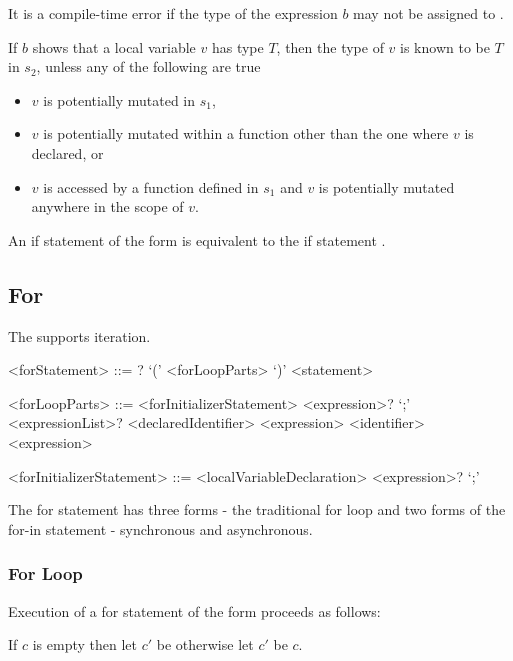 \documentclass[makeidx]{article}
\begin{document}
{\LMHash{}%
It is a compile-time error if the type of the expression $b$ may not be assigned to .

\LMHash{}%
If $b$ shows that a local variable $v$ has type $T$,
then the type of $v$ is known to be $T$ in $s_2$,
unless any of the following are true
\begin{itemize}
\item $v$ is potentially mutated in $s_1$,
\item $v$ is potentially mutated within a function other
than the one where $v$ is declared, or
\item $v$ is accessed by a function defined in $s_1$ and
$v$ is potentially mutated anywhere in the scope of $v$.
\end{itemize}

\LMHash{}%
An if statement of the form  is equivalent to the if statement .


\subsection{For}

\LMHash{}%
The  supports iteration.

\begin{grammar}
<forStatement> ::= \AWAIT? \FOR{} `(' <forLoopParts> `)' <statement>

<forLoopParts> ::= <forInitializerStatement> <expression>? `;' <expressionList>?
  \alt <declaredIdentifier> \IN{} <expression>
  \alt <identifier> \IN{} <expression>

<forInitializerStatement> ::= <localVariableDeclaration>
  \alt <expression>? `;'
\end{grammar}

\LMHash{}%
 The for statement has three forms - the traditional for loop and two forms of the for-in statement - synchronous and asynchronous.


\subsubsection{For Loop}

\LMHash{}%
Execution of a for statement of the form  proceeds as follows:

\LMHash{}%
If $c$ is empty then let $c'$ be \TRUE{} otherwise let $c'$ be $c$.

}
\end{document}
